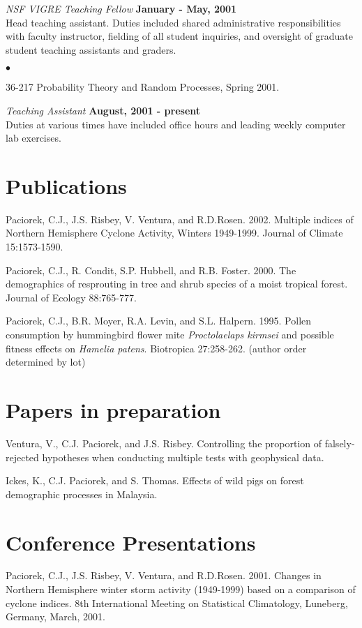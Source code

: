 \documentclass[overlapped,line]{res}
\newenvironment{list2}{
  \begin{list}{$\bullet$}{%
      \setlength{\itemsep}{0in}
      \setlength{\parsep}{0in} \setlength{\parskip}{0in}
      \setlength{\topsep}{0in} \setlength{\partopsep}{0in} 
      \setlength{\leftmargin}{0.2in}}}{\end{list}}
\begin{document}
\begin{resume}
{\em NSF VIGRE Teaching Fellow} \hfill {\bf January - May, 2001}\\
Head teaching assistant.   
Duties included  shared administrative responsibilities with faculty
instructor, fielding of all student inquiries, and oversight of
graduate student teaching assistants and graders.
\vspace*{.05in}  
\begin{list2}
\item 36-217 Probability Theory and Random Processes, Spring 2001.
\end{list2}

{\em Teaching Assistant} \hfill {\bf August, 2001  - present}\\
Duties at various times have included 
office hours and leading weekly computer lab exercises.



\section{\sc Publications}
Paciorek, C.J., J.S. Risbey, V. Ventura, and R.D.Rosen. 2002. Multiple indices of Northern Hemisphere Cyclone
Activity, Winters 1949-1999. Journal of Climate 15:1573-1590.

Paciorek, C.J., R. Condit, S.P. Hubbell, and R.B. Foster.  2000.
The demographics of resprouting in tree and shrub species of a moist
tropical forest.  Journal of Ecology 88:765-777.

Paciorek, C.J., B.R. Moyer, R.A. Levin, and S.L. Halpern.  1995.
Pollen consumption by hummingbird flower mite {\it Proctolaelaps
  kirmsei} and possible fitness effects on {\it Hamelia patens}.
Biotropica 27:258-262.  (author order determined by lot)     

\section{\sc Papers in preparation}

Ventura, V., C.J. Paciorek, and J.S. Risbey.  Controlling the proportion of falsely-rejected hypotheses when conducting multiple tests with geophysical data.

Ickes, K., C.J. Paciorek, and S. Thomas.  Effects of wild pigs on
forest demographic processes in Malaysia.

\section{\sc Conference Presentations}
Paciorek, C.J., J.S. Risbey, V. Ventura, and R.D.Rosen.  2001.  Changes in Northern Hemisphere winter storm activity (1949-1999) based
on a comparison of cyclone indices.  8th International Meeting on
Statistical Climatology, Luneberg, Germany, March, 2001.


\end{resume}
\end{document}
